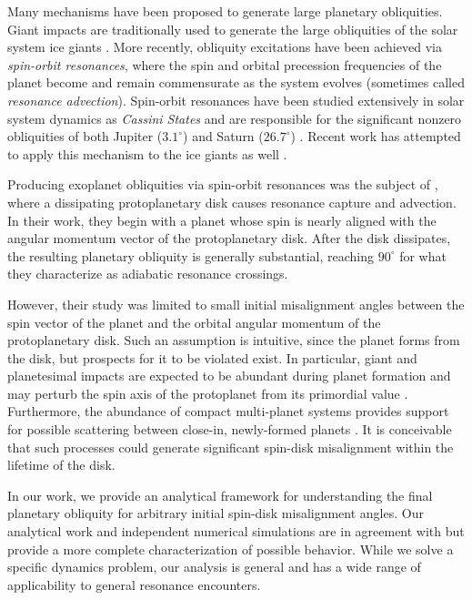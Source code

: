 \documentclass[
        fleqn,
        usenatbib,
        referee,
    ]{mnras}
\begin{document}
Many mechanisms have been proposed to generate large planetary obliquities.
Giant impacts are traditionally used to generate the large obliquities of the
solar system ice giants \citep{original_gi, morbidelli_gi}. More recently,
obliquity excitations have been achieved via \emph{spin-orbit resonances}, where
the spin and orbital precession frequencies of the planet become and remain
commensurate as the system evolves (sometimes called \emph{resonance
advection}). Spin-orbit resonances have been studied extensively in solar system
dynamics as \emph{Cassini States} and are responsible for the significant
nonzero obliquities of both Jupiter ($3.1^\circ$) and Saturn ($26.7^\circ$)
\citep{colombo1966, henrard1987, ward2004I, ward_jupiter}. Recent work has
attempted to apply this mechanism to the ice giants as well
\citep{hamilton_tilting_ice}.

Producing exoplanet obliquities via spin-orbit resonances was the subject of
\citet{millholland_disk}, where a dissipating protoplanetary disk causes
resonance capture and advection. In their work, they begin with a planet whose
spin is nearly aligned with the angular momentum vector of the protoplanetary
disk. After the disk dissipates, the resulting planetary obliquity is generally
substantial, reaching $90^\circ$ for what they characterize as adiabatic
resonance crossings.

However, their study was limited to small initial misalignment angles between
the spin vector of the planet and the orbital angular momentum of the
protoplanetary disk. Such an assumption is intuitive, since the planet forms
from the disk, but prospects for it to be violated exist. In particular, giant
and planetesimal impacts are expected to be abundant during planet formation and
may perturb the spin axis of the protoplanet from its primordial value
\citep{yalinewich2019atmospheric, schlichting2015atmospheric}. Furthermore, the
abundance of compact multi-planet systems provides support for possible
scattering between close-in, newly-formed planets \citep{usp_compact1,
usp_review}. It is conceivable that such processes could generate significant
spin-disk misalignment within the lifetime of the disk.

In our work, we provide an analytical framework for understanding the final
planetary obliquity for arbitrary initial spin-disk misalignment angles. Our
analytical work and independent numerical simulations are in agreement with
\citet{millholland_disk} but provide a more complete characterization of
possible behavior. While we solve a specific dynamics problem, our analysis
is general and has a wide range of applicability to general resonance
encounters.
\end{document}
